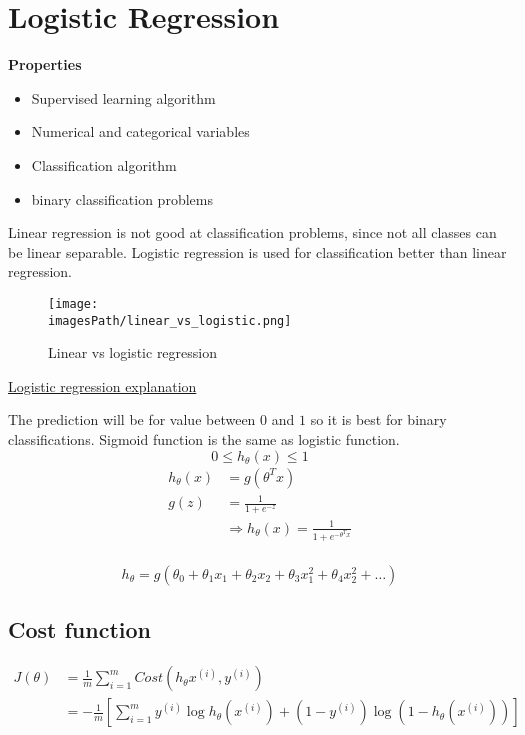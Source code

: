 
\newpage
\section{Logistic Regression}
\textbf{Properties}
\begin{itemize}
    \item Supervised learning algorithm
    \item Numerical and categorical variables 
    \item Classification algorithm
    \item binary classification problems 
\end{itemize}

Linear regression is not good at classification problems, since not all classes can 
be linear separable. Logistic regression is used for classification better than linear regression.
\begin{figure}[!h]
    \centering
    \texttt{[image: \\imagesPath/linear\_vs\_logistic.png]}
    \caption{Linear vs logistic regression}
\end{figure}
\href{https://www.youtube.com/watch?v=-la3q9d7AKQ}{Logistic regression explanation}

The prediction will be for value between $0$ and $1$ so it is best 
for binary classifications. Sigmoid function is the same as logistic function.
\begin{equation*}
    0 \leq h_{\theta}(x) \leq 1
\end{equation*}
\begin{align*}
    h_{\theta}(x) &= g(\theta^T x) \\
    g(z) &= \frac{1}{1+e^{-z}} \\
    &\Rightarrow h_{\theta}(x) = \frac{1}{1+e^{-\theta^T x}} \\
\end{align*}



\begin{equation*}
    h_{\theta} = g(\theta_0 + \theta_1 x_1 + \theta_2 x_2 + \theta_3 x_1^2 + \theta_4 x_2^2 + \ldots)
\end{equation*}

\subsection{Cost function}
\begin{align*}
    J(\theta) &= \frac{1}{m}\sum_{i=1}^m Cost(h_{\theta}x^{(i)},y^{(i)}) \\
    &= -\frac{1}{m}\left[\sum_{i=1}^m y^{(i)}\log{h_{\theta}(x^{(i)}) + (1-y^{(i)})\log(1-h_{\theta}(x^{(i)}))}\right] \\
\end{align*}

